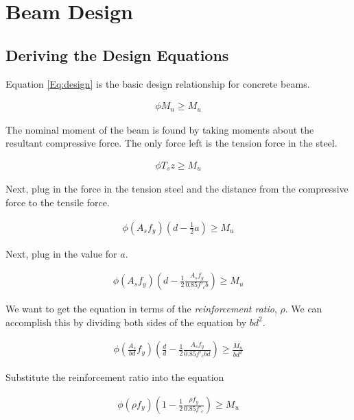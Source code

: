 
\section{Beam Design}

\subsection{Deriving the Design Equations}

Equation \ref{Eq:design} is the basic design relationship for concrete beams.

\begin{align}
	\phi M_n \geq M_u
	\label{Eq:design}
\end{align}

The nominal moment of the beam is found by taking moments about the resultant compressive force. The only force left is the tension force in the steel.

\begin{align}
	\phi T_s z \geq M_u
\end{align}

Next, plug in the force in the tension steel and the distance from the compressive force to the tensile force.

\begin{align}
	\phi
	\left(A_s f_y\right)
	\left(d-\frac{1}{2}a\right)
	\geq
	M_u
\end{align}

Next, plug in the value for $a$.

\begin{align}
	\phi
	\left(A_s f_y\right)
	\left(d-\frac{1}{2}\frac{A_sf_y}{0.85f'_cb}\right)
	\geq
	M_u
\end{align}

We want to get the equation in terms of the \textit{reinforcement ratio}, $\rho$. We can accomplish this by dividing both sides of the equation by $bd^2$.


\begin{align}
	\phi
	\left(\frac{A_s}{bd} f_y\right)
	\left(\frac{d}{d} - \frac12\frac{A_sf_y}{0.85f'_cbd}\right)
	\geq
	\frac{M_u}{bd^2}
\end{align}


Substitute the reinforcement ratio into the equation

\begin{align}
	\phi
	\left(\rho f_y\right)
	\left(1 - \frac12\frac{\rho f_y}{0.85f'_c}\right)
	\geq
	M_u
\end{align}

